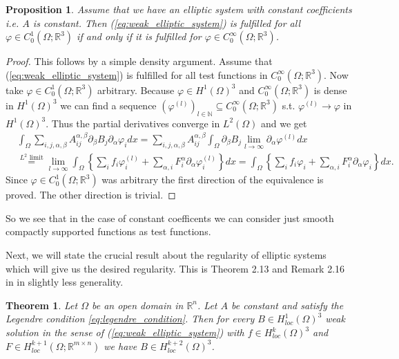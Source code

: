 \documentclass[12pt,a4paper]{article}
\numberwithin{equation}{subsection}
\numberwithin{lemma}{subsection}
\newtheorem{proposition}[lemma]{Proposition}
\newtheorem{theorem}[lemma]{Theorem}
\theoremstyle{definition}
\newcommand{\naturalnum}{\mathbb{N}}
\newcommand{\real}{\mathbb{R}}
\begin{document}
\begin{proposition}
    Assume that we have an elliptic system with constant coefficients i.e. 
    $A$ is constant. Then
    (\ref{eq:weak_elliptic_system}) is fulfilled for all 
    $\varphi \in C^1_0(\Omega;\real^3)$ if and only if it is fulfilled 
    for $\varphi \in C^\infty_0(\Omega;\real^3)$.
\end{proposition}
\begin{proof}
    This follows by a simple density argument. Assume that 
    (\ref{eq:weak_elliptic_system}) is fulfilled for all test functions in 
    $C^\infty_0(\Omega;\real^3)$. Now take $\varphi \in C^1_0(\Omega;\real^3)$
    arbitrary. Because $\varphi \in H^1(\Omega)^3$ and 
    $C^\infty_0(\Omega;\real^3)$ is dense in $H^1(\Omega)^3$ we can find 
    a sequence $(\varphi^{(l)})_{l \in \naturalnum} \subseteq 
    C^\infty_0(\Omega;\real^3)$ s.t. $\varphi^{(l)} \rightarrow \varphi$
    in $H^1(\Omega)^3$. Thus the partial derivatives converge in $L^2(\Omega)$
    and we get
    \begin{align*}
        &\int_\Omega \sum\limits_{i,j,\alpha,\beta} 
            A_{ij}^{\alpha, \beta} \partial_\beta B_j \partial_\alpha \varphi_i
            dx
        = \sum\limits_{i,j,\alpha,\beta} A_{ij}^{\alpha, \beta}
            \int_\Omega \partial_\beta B_j \lim\limits_{l\rightarrow \infty} 
            \partial_\alpha \varphi^{(l)} dx
        \\ &\stackrel{\text{$L^2$ limit}}{=} 
            \lim\limits_{l\rightarrow \infty} 
            \int_\Omega \left\{ \sum\limits_i f_i \varphi^{(l)}_i + 
            \sum\limits_{\alpha,i} F_i^\alpha \partial_\alpha \varphi^{(l)}_i 
            \right\} dx
        = \int_\Omega \left\{ \sum\limits_i f_i \varphi_i + 
            \sum\limits_{\alpha,i} F_i^\alpha \partial_\alpha \varphi_i 
            \right\} dx.
    \end{align*}
    Since $\varphi \in C_0^1(\Omega;\real^3)$ was arbitrary the first 
    direction of the equivalence is proved. The other direction is trivial.
\end{proof}
So we see that in the case of constant coefficents we can consider 
just smooth compactly supported functions as test functions.

Next, we will state the crucial result about the regularity of elliptic systems
which will give us the desired regularity. This is Theorem 2.13 and Remark 2.16 
in \cite{Lectures on ellitic PDEs} in slightly less generality.
\begin{theorem}
    Let $\Omega$ be an open domain in $\real^n$. Let $A$ be constant and 
    satisfy the Legendre condition \ref{eq:legendre_condition}. Then for every 
    $B \in H^1_{loc}(\Omega)^3$ weak solution in the sense of
    (\ref{eq:weak_elliptic_system}) with $f \in H^k_{loc}(\Omega)^3$ and 
    $F \in H^{k+1}_{loc}(\Omega;\real^{m\times n})$ 
    we have $B \in H^{k+2}_{loc}(\Omega)^3$. 
\end{theorem}
\end{document}
